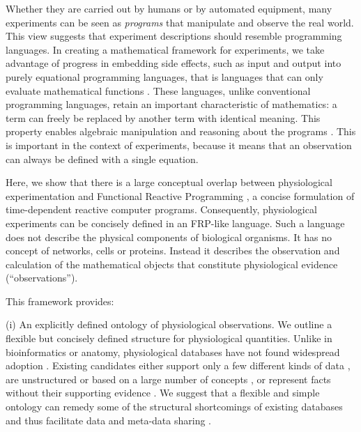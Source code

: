 Whether they are carried out by humans or by automated equipment, many
experiments can be seen as \emph{programs} that manipulate and observe
the real world. This view suggests that experiment descriptions should
resemble programming languages. In creating a mathematical framework
for experiments, we take advantage of progress in embedding side
effects, such as input and output \citep{PeytonJones2002, Roy2004,
  Wadler1995} into purely equational programming languages, that is
languages that can only evaluate mathematical functions
\citep{Church1941}. These languages, unlike conventional programming
languages, retain an important characteristic of mathematics: a term
can freely be replaced by another term with identical meaning.
This property \citep[referential transparency;][]{Whitehead1927} enables
algebraic manipulation and reasoning about the programs
\citep{Bird1996}. This is important in the context of experiments,
because it means that an observation can always be defined with a
single equation.

Here, we show that there is a large conceptual overlap between
physiological experimentation and Functional Reactive Programming
\citep[FRP;][]{Elliott1997, Nilsson2002}, a concise formulation of
time-dependent reactive computer programs. Consequently, physiological
experiments can be concisely defined in an FRP-like language. Such a
language does not describe the physical components of biological
organisms. It has no concept of networks, cells or proteins. Instead
it describes the observation and calculation of the mathematical
objects that constitute physiological evidence (``observations'').

This framework provides:

(i) An explicitly defined ontology of physiological observations. We
outline a flexible but concisely defined structure for physiological
quantities.  Unlike in bioinformatics or anatomy, physiological
databases have not found widespread adoption \citep{Herz2008,
  Amari2002}. Existing candidates either support only a few different
kinds of data \citep{Jessop2010}, are unstructured \citep{Teeters2008}
or based on a large number of concepts \citep{Frishkoff2009}, or
represent facts without their supporting evidence \citep{Katz2010}.
We suggest that a flexible and simple ontology
can remedy some of the structural shortcomings of existing databases
\citep{Gardner2005, Amari2002} and thus facilitate data and meta-data
sharing \citep{Insel2003}.

